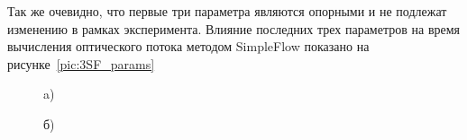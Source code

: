 Так же очевидно, что первые три параметра являются опорными и не подлежат изменению в рамках эксперимента. Влияние последних трех параметров на время вычисления оптического потока методом SimpleFlow показано на рисунке~\ref{pic:3SF_params}
\begin{figure}[!Htb]
\begin{minipage}[h]{0.47\linewidth}
 a) \\
\end{minipage}
\hfill
\begin{minipage}[h]{0.47\linewidth}
 б)\\
\end{minipage}
\vfill
\begin{center}
	\begin{minipage}[h]{0.47\linewidth}

\end{minipage}
\end{center}
\end{figure}
